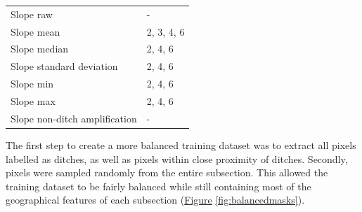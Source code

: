 \documentclass[]{interact}
\theoremstyle{plain}%
\theoremstyle{definition}
\theoremstyle{remark}
\begin{document}
\begin{table} [!htb]
{\begin{tabular}{ll}
      Slope raw & - \\
      Slope mean & 2, 3, 4, 6 \\
      Slope median & 2, 4, 6 \\
      Slope standard deviation & 2, 4, 6 \\
      Slope min & 2, 4, 6 \\
      Slope max & 2, 4, 6 \\
      Slope non-ditch amplification & - \\ \bottomrule
    \end{tabular}}
    \label{featuretable}
\end{table}

The first step to create a more balanced training dataset was to extract all pixels labelled as ditches, as well as pixels within close proximity of ditches. Secondly, pixels were sampled randomly from the entire subsection. This allowed the training dataset to be fairly balanced while still containing most of the geographical features of each subsection (\hyperref[fig:balancedmasks]{Figure} \ref{fig:balancedmasks}).
\end{document}
